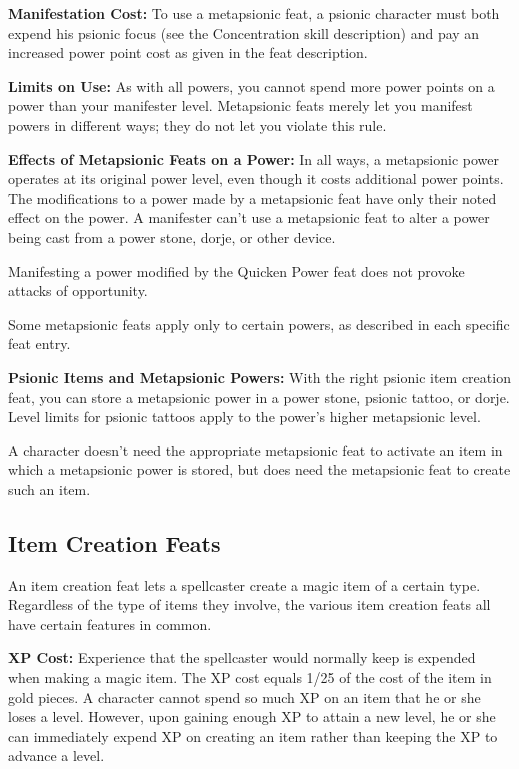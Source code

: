 \textbf{Manifestation Cost:} To use a metapsionic feat, a psionic character must both expend his psionic focus (see the Concentration skill description) and pay an increased power point cost as given in the feat description.

\textbf{Limits on Use:} As with all powers, you cannot spend more power points on a power than your manifester level. Metapsionic feats merely let you manifest powers in different ways; they do not let you violate this rule.

\textbf{Effects of Metapsionic Feats on a Power:} In all ways, a metapsionic power operates at its original power level, even though it costs additional power points. The modifications to a power made by a metapsionic feat have only their noted effect on the power. A manifester can't use a metapsionic feat to alter a power being cast from a power stone, dorje, or other device.

Manifesting a power modified by the Quicken Power feat does not provoke attacks of opportunity.

Some metapsionic feats apply only to certain powers, as described in each specific feat entry.

\textbf{Psionic Items and Metapsionic Powers:} With the right psionic item creation feat, you can store a metapsionic power in a power stone, psionic tattoo, or dorje. Level limits for psionic tattoos apply to the power's higher metapsionic level.

A character doesn't need the appropriate metapsionic feat to activate an item in which a metapsionic power is stored, but does need the metapsionic feat to create such an item.

\subsection{Item Creation Feats}
An item creation feat lets a spellcaster create a magic item of a certain type. Regardless of the type of items they involve, the various item creation feats all have certain features in common.

\textbf{XP Cost:} Experience that the spellcaster would normally keep is expended when making a magic item. The XP cost equals 1/25 of the cost of the item in gold pieces. A character cannot spend so much XP on an item that he or she loses a level. However, upon gaining enough XP to attain a new level, he or she can immediately expend XP on creating an item rather than keeping the XP to advance a level.

